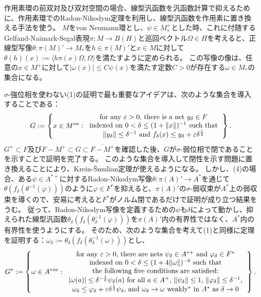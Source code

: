 \documentclass[noamsfonts,a4paper,10pt]{amsart}
\theoremstyle{plain}
\theoremstyle{definition}
\theoremstyle{remark}
\begin{document}
作用素環の前双対及び双対空間の場合、線型汎函数を汎函数計算で抑えるために、作用素環でのRadon-Nikodym定理を利用し、線型汎函数を作用素に置き換える手法を使う。
$M$をvon Neumann環とし、$\psi\in M_*^+$とした時、これに付随するGelfand-Naimark-Segal表現$\pi:M\to B(H)$と巡回ベクトル$\Omega\in H$を考えると、正線型写像$\theta:\pi(M)'\to M_*$を$h\in\pi(M)'$と$x\in M$に対して$\theta(h)(x):=\langle h\pi(x)\Omega,\Omega\rangle$を満たすように定められる。
この写像の像は、任意の$x\in M^+$に対して$|\omega(x)|\le C\psi(x)$を満たす定数$C>0$が存在する$\omega\in M_*$の集合になる。

$\sigma$-強位相を使わない(1)の証明で最も重要なアイデアは、次のような集合を導入することである：
\[G:=\left\{x\in M^{sa}:\begin{tabular}{c}
for any $\varepsilon>0$, there is a net $y_\delta\in F$\\
indexed on $0<\delta\le(1+\|x\|)^{-1}$ such that\\
$\|y_\delta\|\le\delta^{-1}$ and $f_\delta(x)\le y_\delta+\varepsilon\delta^{\frac12}$
\end{tabular}\right\}.\]
$G^+\subset F$及び$F-M^+\subset G\subset\overline{F-M^+}$を確認した後、$G$が$\sigma$-弱位相で閉であることを示すことで証明を完了する。
このような集合を導入して閉性を示す問題に置き換えることにより、Krein-\v Smulian定理が使えるようになる。
しかし、(4)の場合、ある$\psi\in A^{*+}$に対するRadon-Nikodym写像$\theta:\pi(A)'\to A^*$を通じて$\theta(f_\delta(\theta^{-1}(\varphi)))$のように$\varphi\in F^*$を抑えると、$\pi(A)'$の$\sigma$-弱収束が$A^*$上の弱収束を導くので、安易に考えると$F^*$がノルム閉であるだけで証明が成り立つ結果をうむ。
従って、Radon-Nikodym写像を定義するための$\psi$も$\delta$によって動かし、抑えられた線型汎函数$\theta_\delta(f_\delta(\theta_\delta^{-1}(\varphi)))$を$\pi(A)'$内の有界性ではなく、$A^*$内の有界性を使うようにする。
そのため、次のような集合を考えて(1)と同様に定理を証明する：$\omega_\delta:=\theta_\delta(f_\delta(\theta_{\delta}^{-1}(\omega)))$とし、
\[G^*:=\left\{\omega\in A^{*sa}:\begin{tabular}{c}
for any $\varepsilon>0$, there are nets $\psi_\delta\in A^{*+}$ and $\varphi_\delta\in F^*$\\
indexed on $0<\delta\le(1+4\|\omega\|)^{-6}$ such that\\
the following five conditions are satisfied:\\
 $|\omega(a)|\le\delta^{-\frac16}\psi_\delta(a)$ for all $a\in A^+$, $\|\psi_\delta\|\le1$, $\|\varphi_\delta\|\le\delta^{-1}$,\\
$\omega_\delta\le\varphi_\delta+\varepsilon\delta^{\frac12}\psi_\delta$, and $\omega_\delta\to\omega$ weakly$^*$ in $A^*$ as $\delta\to0$
\end{tabular}\right\}.\]

\thispagestyle{empty}
\end{document}
